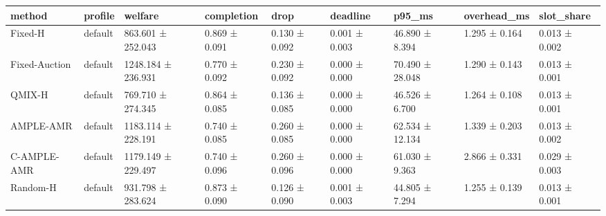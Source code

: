 \begin{tabular}{lllllllll}
\toprule
method & profile & welfare & completion & drop & deadline & p95\_ms & overhead\_ms & slot\_share \\
\midrule
Fixed-H & default & 863.601 ± 252.043 & 0.869 ± 0.091 & 0.130 ± 0.092 & 0.001 ± 0.003 & 46.890 ± 8.394 & 1.295 ± 0.164 & 0.013 ± 0.002 \\
Fixed-Auction & default & 1248.184 ± 236.931 & 0.770 ± 0.092 & 0.230 ± 0.092 & 0.000 ± 0.000 & 70.490 ± 28.048 & 1.290 ± 0.143 & 0.013 ± 0.001 \\
QMIX-H & default & 769.710 ± 274.345 & 0.864 ± 0.085 & 0.136 ± 0.085 & 0.000 ± 0.000 & 46.526 ± 6.700 & 1.264 ± 0.108 & 0.013 ± 0.001 \\
AMPLE-AMR & default & 1183.114 ± 228.191 & 0.740 ± 0.085 & 0.260 ± 0.085 & 0.000 ± 0.000 & 62.534 ± 12.134 & 1.339 ± 0.203 & 0.013 ± 0.002 \\
C-AMPLE-AMR & default & 1179.149 ± 229.497 & 0.740 ± 0.096 & 0.260 ± 0.096 & 0.000 ± 0.000 & 61.030 ± 9.363 & 2.866 ± 0.331 & 0.029 ± 0.003 \\
Random-H & default & 931.798 ± 283.624 & 0.873 ± 0.090 & 0.126 ± 0.090 & 0.001 ± 0.003 & 44.805 ± 7.294 & 1.255 ± 0.139 & 0.013 ± 0.001 \\
\bottomrule
\end{tabular}
